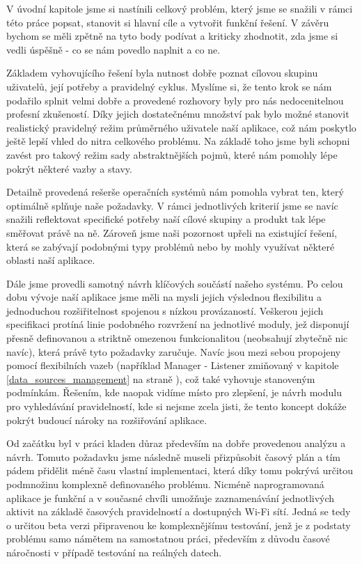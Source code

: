 \documentclass[thesis=M,czech]{FITthesis}[2012/06/26]
\begin{document}
\begin{conclusion}
V úvodní kapitole jsme si nastínili celkový problém, který jsme se snažili v rámci této práce popsat, stanovit si hlavní cíle a vytvořit funkční řešení. V závěru bychom se měli zpětně na tyto body podívat a kriticky zhodnotit, zda jsme si vedli úspěšně - co se nám povedlo naplnit a co ne.

Základem vyhovujícího řešení byla nutnost dobře poznat cílovou skupinu uživatelů, její potřeby a pravidelný cyklus. Myslíme si, že tento krok se nám podařilo splnit velmi dobře a provedené rozhovory byly pro nás nedocenitelnou profesní zkušeností. Díky jejich dostatečnému množství pak bylo možné stanovit realistický pravidelný režim průměrného uživatele naší aplikace, což nám poskytlo ještě lepší vhled do nitra celkového problému. Na základě toho jsme byli schopni zavést pro takový režim sady abstraktnějších pojmů, které nám pomohly lépe pokrýt některé vazby a stavy.

Detailně provedená rešerše operačních systémů nám pomohla vybrat ten, který optimálně splňuje naše požadavky. V rámci jednotlivých kriterií jsme se navíc snažili reflektovat specifické potřeby naší cílové skupiny a produkt tak lépe směřovat právě na ně. Zároveň jsme naši pozornost upřeli na existující řešení, která se zabývají podobnými typy problémů nebo by mohly využívat některé oblasti naší aplikace.

Dále jsme provedli samotný návrh klíčových součástí našeho systému. Po celou dobu vývoje naší aplikace jsme měli na mysli jejich výslednou flexibilitu a jednoduchou rozšiřitelnost spojenou s nízkou provázaností. Veškerou jejich specifikaci protíná linie podobného rozvržení na jednotlivé moduly, jež disponují přesně definovanou a striktně omezenou funkcionalitou (neobsahují zbytečně nic navíc), která právě tyto požadavky zaručuje. Navíc jsou mezi sebou propojeny pomocí flexibilních vazeb (například Manager - Listener zmiňovaný v kapitole \ref{data_sources_management} na straně \pageref{data_sources_management}), což také vyhovuje stanoveným podmínkám. Řešením, kde naopak vidíme místo pro zlepšení, je návrh modulu pro vyhledávání pravidelností, kde si nejsme zcela jisti, že tento koncept dokáže pokrýt budoucí nároky na rozšiřování aplikace.

Od začátku byl v práci kladen důraz především na dobře provedenou analýzu a návrh. Tomuto požadavku jsme následně museli přizpůsobit časový plán a tím pádem přidělit méně času vlastní implementaci, která díky tomu pokrývá určitou podmnožinu komplexně definovaného problému. Nicméně naprogramovaná aplikace je funkční a v současné chvíli umožňuje zaznamenávání jednotlivých aktivit na základě časových pravidelností a dostupných Wi-Fi sítí. Jedná se tedy o určitou beta verzi připravenou ke komplexnějšímu testování, jenž je z podstaty problému samo námětem na samostatnou práci, především z důvodu časové náročnosti v případě testování na reálných datech.
\end{conclusion}
\end{document}
